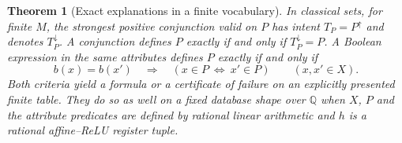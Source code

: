 \documentclass[11pt,a4paper]{article}
\newtheorem{theorem}{Theorem}[section]
\theoremstyle{definition}
\theoremstyle{remark}\newaliascnt{remark}{theorem}
\newcommand{\Q}{\mathbb Q}
\numberwithin{equation}{section}
\begin{document}
\begin{theorem}[Exact explanations in a finite vocabulary]\label{thm:concept-expressibility}
In classical sets, for finite $M$, the strongest positive conjunction valid on $P$ has intent $T_P=P^\uparrow$ and denotes $T_P^\downarrow$. A conjunction defines $P$ exactly if and only if $T_P^\downarrow=P$. A Boolean expression in the same attributes defines $P$ exactly if and only if
\[
 b(x)=b(x')\quad\Longrightarrow\quad (x\in P\ \Longleftrightarrow\ x'\in P)
 \qquad(x,x'\in X).
\]
Both criteria yield a formula or a certificate of failure on an explicitly presented finite table. They do so as well on a fixed database shape over $\Q$ when $X$, $P$ and the attribute predicates are defined by rational linear arithmetic and $h$ is a rational affine--ReLU register tuple.
\end{theorem}
\end{document}
